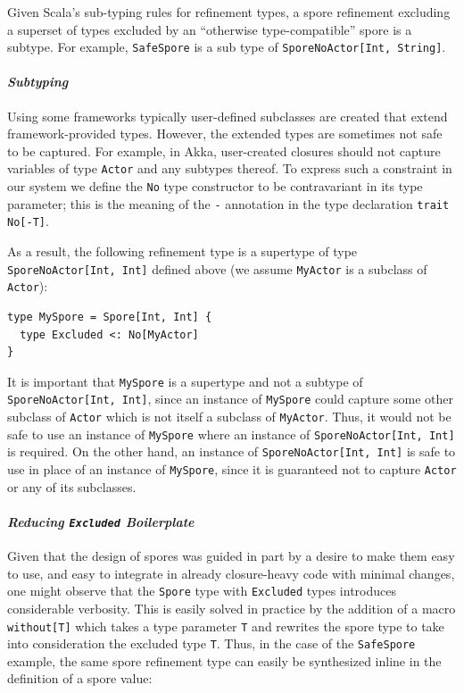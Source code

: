 \documentclass{llncs}
\begin{document}
Given Scala's sub-typing rules for refinement types, a spore refinement
excluding a superset of types excluded by an ``otherwise type-compatible''
spore is a subtype. For example, \verb|SafeSpore| is a sub type of
\verb|SporeNoActor[Int, String]|.

\paragraph{\textbf{\textit{Subtyping}}}

Using some frameworks typically user-defined subclasses are created that extend framework-provided types. However, the extended types are sometimes not safe to be captured. For example, in Akka, user-created closures should not capture variables of type \verb|Actor| and any subtypes thereof. To express such a constraint in our system we define the \verb|No| type constructor to be contravariant in its type parameter; this is the meaning of the \verb|-| annotation in the type declaration \verb|trait No[-T]|.

As a result, the following refinement type is a supertype of type \verb|SporeNoActor[Int, Int]| defined above (we assume \verb|MyActor| is a subclass of \verb|Actor|):

\begin{lstlisting}
type MySpore = Spore[Int, Int] {
  type Excluded <: No[MyActor]
}
\end{lstlisting}
\noindent
It is important that \verb|MySpore| is a supertype and not a subtype of \verb|SporeNoActor[Int, Int]|, since an instance of \verb|MySpore| could capture some other subclass of \verb|Actor| which is not itself a subclass of \verb|MyActor|. Thus, it would not be safe to use an instance of \verb|MySpore| where an instance of \verb|SporeNoActor[Int, Int]| is required. On the other hand, an instance of \verb|SporeNoActor[Int, Int]| is safe to use in place of an instance of \verb|MySpore|, since it is guaranteed not to capture \verb|Actor| or any of its subclasses.

\paragraph{\textbf{\textit{Reducing \texttt{Excluded} Boilerplate}}}

Given that the design of spores was guided in part by a desire to make them
easy to use, and easy to integrate in already closure-heavy code with minimal
changes, one might observe that the \verb|Spore| type with \verb|Excluded|
types introduces considerable verbosity. This is easily solved in practice by
the addition of a macro \verb|without[T]| which takes a type parameter
\verb|T| and rewrites the spore type to take into consideration the excluded
type \verb|T|. Thus, in the case of the \verb|SafeSpore| example, the same spore
refinement type can easily be synthesized inline in the definition of a spore value:
\end{document}
